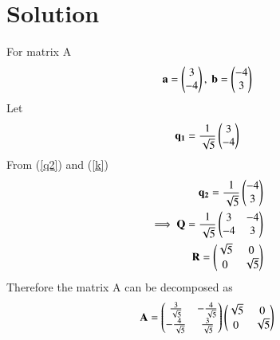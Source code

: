 \documentclass[journal,12pt,twocolumn]{IEEEtran}
\begin{document}
\section{Solution}
For matrix A
\begin{align}
	\mathbf{a}=\begin{pmatrix}3\\-4\end{pmatrix}, \ \mathbf{b}=\begin{pmatrix}-4\\3\end{pmatrix} \\
\end{align}
Let
\begin{align}
	\mathbf{q_1}=\frac{1}{\sqrt{5}}\begin{pmatrix}3\\-4\end{pmatrix} \\
\end{align}
From (\ref{q2}) and (\ref{k})
\begin{align}
	\mathbf{q_2}=\frac{1}{\sqrt{5}}\begin{pmatrix}-4\\3\end{pmatrix}\\
	\implies 
	\mathbf{Q}=\frac{1}{\sqrt{5}}\begin{pmatrix}3 & -4 \\ -4 & 3\end{pmatrix} \\
	\mathbf{R}=\begin{pmatrix}\sqrt{5} & 0 \\ 0 & \sqrt{5}\end{pmatrix}
\end{align}
Therefore the matrix A can be decomposed as 
\begin{align}
	\mathbf{A}=
	\begin{pmatrix}\frac{3}{\sqrt{5}} & -\frac{4}{\sqrt{5}} \\
	      -\frac{4}{\sqrt{5}} & \frac{3}{\sqrt{5}} \end{pmatrix}
	\begin{pmatrix}\sqrt{5} & 0 \\ 0 & \sqrt{5}\end{pmatrix}
\end{align}
\end{document}
